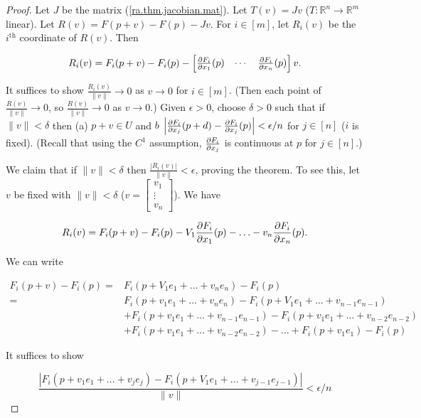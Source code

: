   \begin{proof}
  
Let \(J\) be the matrix (\ref{ra.thm.jacobian.mat}). Let \(T(v) = Jv\) (\(T: \mathbb{R}^n \to \mathbb{R}^m\) linear). Let \(R(v) = F(p+v) - F(p) - Jv\). For \(i \in [m]\), let \(R_i(v) \) be the \(i^\text{th}\) coordinate of \(R(v)\). Then

\[
R_i(v) = F_i(p+v) - F_i(p) - \begin{bmatrix} \pderiv{F_i}{x_1}(p) & \cdots &  \pderiv{F_i}{x_n}(p) \end{bmatrix} v.
\]

It suffices to show \(\frac{R_i(v)}{\lVert v \rVert} \to 0\) as \(v \to 0\) for \(i \in [m]\). (Then each point of \(\frac{R(v)}{\lVert v \rVert} \to 0\), so \(\frac{R(v)}{\lVert v \rVert} \to 0\) as \(v \to 0\).) Given \(\epsilon > 0\), choose \(\delta > 0\) such that if \(\lVert v \rVert < \delta\) then (a) \(p + v \in U\) and \(b\) \( \left| \pderiv{F_i}{x_j} (p + d) - \pderiv{F_i}{x_j}(p) \right| < \epsilon/n\) for \(j \in [n]\) (\(i\) is fixed). (Recall that using the \(C^1\) assumption, \(\pderiv{F_i}{x_j}\) is continuous at \(p\) for \(j \in [n]\).) 

We claim that if \(\lVert v \rVert < \delta\) then \(\frac{ | R_i(v)|}{\lVert v \rVert} < \epsilon\), proving the theorem. To see this, let \(v\) be fixed with \(\lVert v \rVert < \delta\) (\(v = \begin{bmatrix} v_1 \\ \vdots \\ v_n \end{bmatrix}\)). We have

\[
R_i(v) = F_i(p+v) - F_i(p) - V_1 \pderiv{F_i}{x_1}(p) - \ldots - v_n \pderiv{F_i}{x_n}(p).
\]
  
We can write 

\begin{align*}
F_i(p+v) - F_i(p)  = & F_i(p + V_1 e_1 + \ldots + v_n e_n) - F_i(p)
\\  = &  F_i(p + v_1 e_1 + \ldots + v_n e_n) - F_i(p + V_1 e_1 + \ldots + v_{n-1} e_{n-1}) 
\\ & + F_i(p + v_1 e_1 + \ldots + v_{n-1} e_{n-1}) - F_i(p + v_1e_1 + \ldots + v_{n-2} e_{n-2}) 
\\ & + F_i(p + v_1 e_1+ \ldots + v_{n-2} e_{n-2}) - \ldots + F_i(p + v_1 e_1) - F_i(p)
\end{align*}  

It suffices to show 

\[
\frac{ \left| F_i(p + v_1 e_1 + \ldots + v_j e_j) - F_i(p + V_1 e_1 + \ldots + v_{j-1} e_{j-1}) \right|}{\lVert v \rVert} < \epsilon/n
\]


\end{proof}

